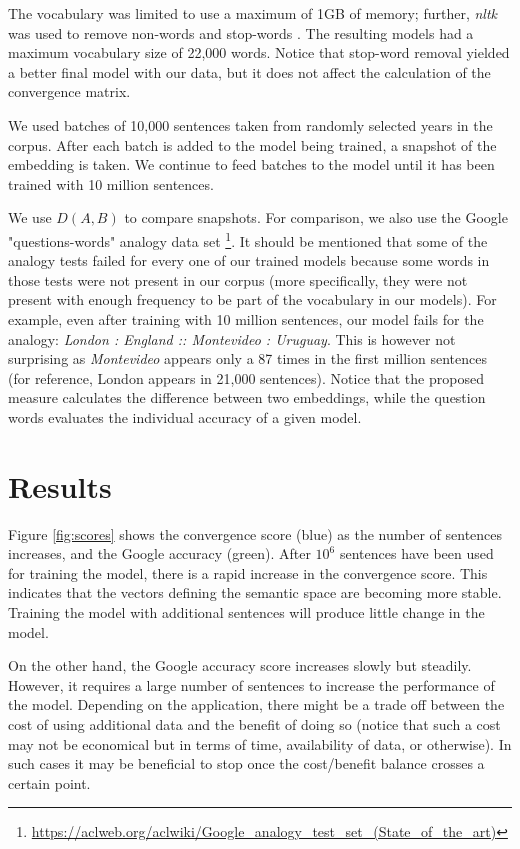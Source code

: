 \documentclass{article} %
\begin{document}
The vocabulary was limited to use a maximum of 1GB of memory; further, \textit{nltk} was used to remove non-words and stop-words \cite{Bird_NLP2009}. The resulting models had a maximum vocabulary size of 22,000 words. Notice that stop-word removal yielded a better final model with our data, but it does not affect the calculation of the convergence matrix.

We used batches of 10,000 sentences taken from randomly selected years in the corpus. After each batch is added to the model being trained, a snapshot of the embedding is taken. We continue to feed batches to the model until it has been trained with 10 million sentences.

We use $D(A,B)$ to compare snapshots. For comparison, we also use the Google "questions-words" analogy data set \cite{Mikolov_CS2013}\footnote{\url{https://aclweb.org/aclwiki/Google_analogy_test_set_(State_of_the_art)}}. It should be mentioned that some of the analogy tests failed for every one of our trained models because some words in those tests were not present in our corpus (more specifically, they were not present with enough frequency to be part of the vocabulary in our models). For example, even after training with 10 million sentences, our model fails for the analogy: \textit{London : England :: Montevideo : Uruguay}. This is however not surprising as \textit{Montevideo} appears only a 87 times in the first million sentences (for reference, London appears in 21,000 sentences). Notice that the proposed measure calculates the difference between two embeddings, while the question words evaluates the individual accuracy of a given model.

\section{Results}
\label{sec:results}

Figure \ref{fig:scores} shows the convergence score (blue) as the number of sentences increases, and the Google accuracy (green). After $10^6$ sentences have been used for training the model, there is a rapid increase in the convergence score. This indicates that the vectors defining the semantic space are becoming more stable. Training the model with additional sentences will produce little change in the model.

On the other hand, the Google accuracy score increases slowly but steadily. However, it requires a large number of sentences to increase the performance of the model. Depending on the application, there might be a trade off between the cost of using additional data and the benefit of doing so (notice that such a cost may not be economical but in terms of time, availability of data, or otherwise). In such cases it may be beneficial to stop once the cost/benefit balance crosses a certain point.
\end{document}
